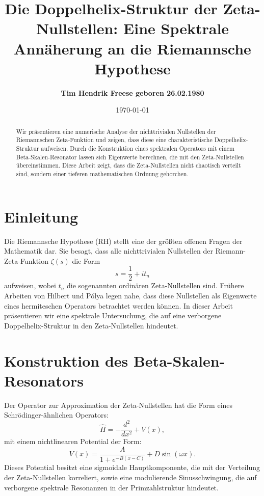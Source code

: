 \documentclass[a4paper,12pt]{article}
\title{\textbf{Die Doppelhelix-Struktur der Zeta-Nullstellen: Eine Spektrale Annäherung an die Riemannsche Hypothese}}
\author{\textbf{Tim Hendrik Freese geboren 26.02.1980}}
\date{\today}
\begin{document}
\maketitle

\begin{abstract}
Wir präsentieren eine numerische Analyse der nichttrivialen Nullstellen der Riemannschen Zeta-Funktion und zeigen, dass diese eine charakteristische Doppelhelix-Struktur aufweisen. Durch die Konstruktion eines spektralen Operators mit einem Beta-Skalen-Resonator lassen sich Eigenwerte berechnen, die mit den Zeta-Nullstellen übereinstimmen. Diese Arbeit zeigt, dass die Zeta-Nullstellen nicht chaotisch verteilt sind, sondern einer tieferen mathematischen Ordnung gehorchen.
\end{abstract}

\section{Einleitung}
Die Riemannsche Hypothese (RH) stellt eine der größten offenen Fragen der Mathematik dar. Sie besagt, dass alle nichttrivialen Nullstellen der Riemann-Zeta-Funktion $\zeta(s)$ die Form
\begin{equation}
    s = \frac{1}{2} + i t_n
\end{equation}
aufweisen, wobei $t_n$ die sogenannten ordinären Zeta-Nullstellen sind. Frühere Arbeiten von Hilbert und Pólya legen nahe, dass diese Nullstellen als Eigenwerte eines hermiteschen Operators betrachtet werden können. In dieser Arbeit präsentieren wir eine spektrale Untersuchung, die auf eine verborgene Doppelhelix-Struktur in den Zeta-Nullstellen hindeutet.

\section{Konstruktion des Beta-Skalen-Resonators}
Der Operator zur Approximation der Zeta-Nullstellen hat die Form eines Schrödinger-ähnlichen Operators:
\begin{equation}
    \hat{H} = -\frac{d^2}{dx^2} + V(x),
\end{equation}
mit einem nichtlinearen Potential der Form:
\begin{equation}
    V(x) = \frac{A}{1 + e^{-B (x - C)}} + D \sin(\omega x).
\end{equation}
Dieses Potential besitzt eine sigmoidale Hauptkomponente, die mit der Verteilung der Zeta-Nullstellen korreliert, sowie eine modulierende Sinusschwingung, die auf verborgene spektrale Resonanzen in der Primzahlstruktur hindeutet.
\end{document}
